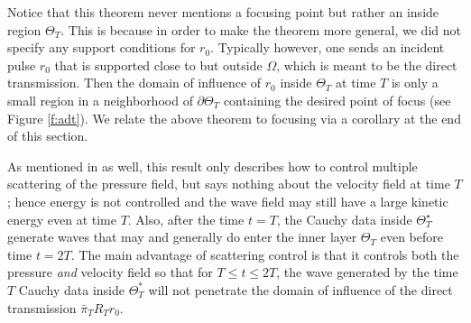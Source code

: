 \documentclass[10pt]{article}
\theoremstyle{plain}
\theoremstyle{definition}
\theoremstyle{remark}
\numberwithin{theorem}{section}
\numberwithin{example}{section}
\numberwithin{equation}{section}
\numberwithin{figure}{section}
\begin{document}
\begin{rem}
Notice that this theorem never mentions a focusing point but rather an inside region $\Theta_T$. This is because in order to make the theorem more general, we did not specify any support conditions for $r_0$. Typically however, one sends an incident pulse $r_0$ that is supported close to but outside $\Omega$, which is meant to be the direct transmission. Then the domain of influence of $r_0$ inside $\Theta_T$ at time $T$ is only a small region in a neighborhood of $\partial \Theta_T$ containing the desired point of focus (see Figure \ref{f:adt}). We relate the above theorem to focusing via a corollary at the end of this section.
\end{rem}

\begin{rem}
As mentioned in \cite{Rose02} as well, this result only describes how to control multiple scattering of the pressure field, but says nothing about the velocity field at time $T$; hence energy is not controlled and the wave field may still have a large kinetic energy even at time $T$. Also, after the time $t=T$, the Cauchy data inside $\Theta_T^\star$ generate waves that may and generally do enter the inner layer $\Theta_T$ even before time $t=2T$. The main advantage of scattering control is that it controls both the pressure \textit{and} velocity field so that for $T \leq t \leq 2T$, the wave generated by the time $T$ Cauchy data inside $\Theta^*_T$ will not penetrate the domain of influence of the direct transmission $\bar{\pi}_TR_Tr_{0}$.
\end{rem}
\end{document}
